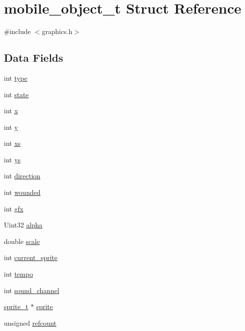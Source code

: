 \hypertarget{structmobile__object__t}{}\section{mobile\+\_\+object\+\_\+t Struct Reference}
\label{structmobile__object__t}


{\ttfamily \#include $<$graphics.\+h$>$}

\subsection*{Data Fields}
\begin{DoxyCompactItemize}
\item 
int \hyperlink{structmobile__object__t_ac765329451135abec74c45e1897abf26}{type}
\item 
int \hyperlink{structmobile__object__t_a89f234133d3efe315836311cbf21c64b}{state}
\item 
int \hyperlink{structmobile__object__t_a6150e0515f7202e2fb518f7206ed97dc}{x}
\item 
int \hyperlink{structmobile__object__t_a0a2f84ed7838f07779ae24c5a9086d33}{y}
\item 
int \hyperlink{structmobile__object__t_a845bd51a19de5064e1ac64c37e397bfa}{xs}
\item 
int \hyperlink{structmobile__object__t_aed10fe93094b6ff4ca09057614bb3602}{ys}
\item 
int \hyperlink{structmobile__object__t_a886d551d5381dc3e53f17825ffc51641}{direction}
\item 
int \hyperlink{structmobile__object__t_ad71db7f45de7f7d4eb1f69efa27a8244}{wounded}
\item 
int \hyperlink{structmobile__object__t_a79a3c1df2a15b4664553987a79d9d800}{gfx}
\item 
Uint32 \hyperlink{structmobile__object__t_a8d15da09d1ec14c258ba5d043db8aca3}{alpha}
\item 
double \hyperlink{structmobile__object__t_a80d402d10e8341004c0caf10133b80ab}{scale}
\item 
int \hyperlink{structmobile__object__t_a6c532969498efe30e831a15714996fdc}{current\+\_\+sprite}
\item 
int \hyperlink{structmobile__object__t_a516115750e956e7c851392eeb95d7dcb}{tempo}
\item 
int \hyperlink{structmobile__object__t_a0a1bea42893f428cda88c35ab550dcf2}{sound\+\_\+channel}
\item 
\hyperlink{structsprite__t}{sprite\+\_\+t} $\ast$ \hyperlink{structmobile__object__t_aea0d55ed5eb92b131b710a6bb0585782}{sprite}
\item 
unsigned \hyperlink{structmobile__object__t_a4b6bc7ece5d64a4a47392d1641a4102a}{refcount}
\end{DoxyCompactItemize}


